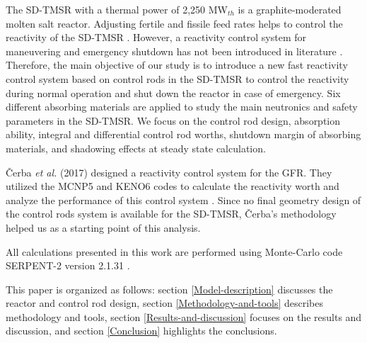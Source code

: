 The \gls{SD-TMSR} with a thermal power of 2,250 MW$_{th}$ 
\cite{ashraf2020whole,li_optimization_2018} is a graphite-moderated 
molten salt reactor. Adjusting fertile and fissile feed rates helps to control the reactivity of 
the SD-TMSR \cite{ashraf2020whole,ashraf2020Strategies,li_optimization_2018}. However, a reactivity control system for maneuvering and emergency shutdown has not been introduced in literature \cite{li_optimization_2018,zou2018transition,zhang2020radiotoxicity,jiang2012advanced,zou2018preliminary,ZOU2015114}. Therefore, the main objective of our study is to introduce a new 
fast reactivity control system based on control rods in the \gls{SD-TMSR} to control 
the reactivity during normal operation and shut down the reactor in case of 
emergency. Six different absorbing materials are 
applied to study the main neutronics and safety parameters in the SD-TMSR. We 
focus on the control rod design, absorption ability, integral and differential 
control rod worths, shutdown margin of absorbing materials, and shadowing 
effects at steady state calculation.

\v{C}erba \emph{et al.} (2017) designed a reactivity control system for the 
GFR. They utilized the MCNP5 \cite{briesmeister2000mcnptm} and KENO6 codes 
\cite{petrie1984keno} to calculate the reactivity worth and analyze the 
performance of this control system \cite{vcerba2017optimization}. Since no 
final geometry design of the control rods system is available for the SD-TMSR, 
\v{C}erba's methodology \cite{vcerba2017optimization} helped us as a starting 
point of this analysis.

All calculations presented in this work are performed using Monte-Carlo code SERPENT-2 version 2.1.31 \cite{leppanen2014serpent}.

This paper is organized as follows: section \ref{Model-description} discusses the reactor and control rod design, section \ref{Methodology-and-tools} describes methodology and tools, section \ref{Results-and-discussion} focuses on the results and discussion, and section \ref{Conclusion} highlights the conclusions.